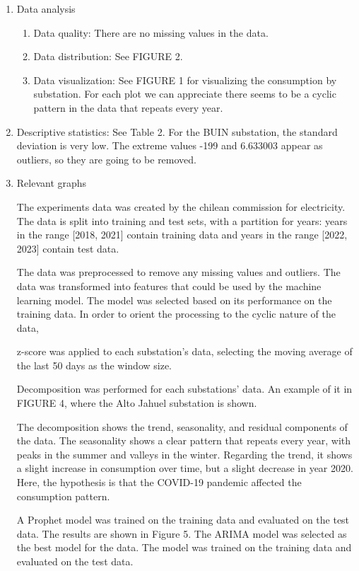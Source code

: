 \documentclass{ieeeaccess}
\begin{document}
\begin{enumerate}
    \item Data analysis
    \begin {enumerate}
        \item {Data quality}: There are no missing values in the data.
        \item Data distribution: See FIGURE 2. 
        \item Data visualization: See FIGURE 1 for visualizing the consumption by substation. For each plot we can appreciate there seems to be a cyclic pattern in the data that repeats every year.
    \end{enumerate}
    \item Descriptive statistics: See Table 2. For the BUIN substation, the standard
    deviation is very low. The extreme values -199 and 6.633003 appear as outliers, so they are going to be removed.
    \item Relevant graphs

The experiments data was created by the chilean commission for electricity.
The data is split into training and test sets, with a partition for years: years in the range [2018, 2021] contain training data and years in the range [2022, 2023] contain test data.

The data was preprocessed to remove any missing values and outliers. The data was transformed into features that could be used by the machine learning model.
The model was selected based on its performance on the training data. In order to orient the processing to the cyclic nature of the data,

z-score was applied to each substation's data, selecting the moving average of the last 50 days as the window size.

Decomposition was performed for each substations' data. An example of it in FIGURE 4, where the Alto Jahuel substation is shown.

The decomposition shows the trend, seasonality, and residual components of the data.
The seasonality shows a clear pattern that repeats every year, with peaks in the summer and valleys in the winter.
Regarding the trend, it shows a slight increase in consumption over time, but a slight decrease in year 2020. Here, the hypothesis is that the COVID-19 pandemic affected the consumption pattern.

A Prophet model was trained on the training data and evaluated on the test data. The results are shown in Figure 5.
The ARIMA model was selected as the best model for the data. The model was trained on the training data and evaluated on the test data.


\end{enumerate}
\end{document}
